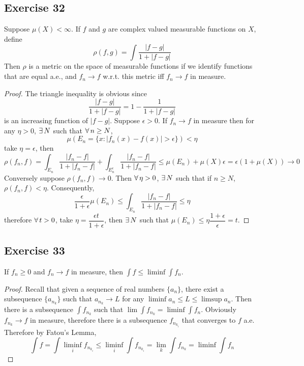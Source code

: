\subsection*{Exercise 32}
Suppose $\mu(X)<\infty$. If $f$ and $g$ are complex valued measurable functions on $X$, define
$$
\rho(f,g)=\int\dfrac{|f-g|}{1+|f-g|}
$$
Then $\rho$ is a metric on the space of measurable functions if we identify functions that are equal a.e., and $f_n\to f$ w.r.t. this metric iff $f_n\to f$ in measure.
\begin{proof}
    The triangle inequality is obvious since
    $$
    \dfrac{|f-g|}{1+|f-g|}=1-\dfrac{1}{1+|f-g|}
    $$
    is an increasing function of $|f-g|$. Suppose $\epsilon>0$. If $f_n\to f$ in measure then for any $\eta>0$, $\exists\, N$ such that $\forall\, n\ge N$,
    $$
    \mu(E_n=\{x:|f_n(x)-f(x)|>\epsilon\})<\eta
    $$
    take $\eta=\epsilon$, then
    $$
    \rho(f_n,f)=\int_{E_n}\dfrac{|f_n-f|}{1+|f_n-f|}+\int_{E_n^c}\dfrac{|f_n-f|}{1+|f_n-f|}\le\mu(E_n)+\mu(X)\epsilon=\epsilon(1+\mu(X))\to 0
    $$
    Conversely suppose $\rho(f_n,f)\to 0$. Then $\forall\,\eta>0$, $\exists\, N$ such that if $n\ge N$, $\rho(f_n,f)<\eta$. Consequently,
    $$
    \dfrac{\epsilon}{1+\epsilon}\mu(E_n)\le\int_{E_n}\dfrac{|f_n-f|}{1+|f_n-f|}\le\eta
    $$
    therefore $\forall\, t>0$, take $\eta=\dfrac{\epsilon t}{1+\epsilon}$, then $\exists\, N$ such that $\mu(E_n)\le\eta\dfrac{1+\epsilon}{\epsilon}=t$.
\end{proof}
\subsection*{Exercise 33}
If $f_n\ge 0$ and $f_n\to f$ in measure, then $\int f\le\liminf\int f_n$. 
\begin{proof}
    Recall that given a sequence of real numbers $\{a_{n}\}$, there exist a subsequence $\{a_{n_k}\}$ such that $a_{n_k}\to L$ for any $\liminf a_n\le L\le\limsup a_n$. Then there is a subsequence $\int f_{n_k}$ such that $\lim\int f_{n_k}=\liminf\int f_n$. Obviously $f_{n_k}\to f$ in measure, therefore there is a subsequence $f_{n_{k_i}}$ that converges to $f$ a.e. Therefore by Fatou's Lemma,
    $$
    \int f=\int\liminf_i f_{n_{k_i}}\le\liminf_i\int f_{n_{k_i}}=\lim_k\int f_{n_k}=\liminf\int f_n
    $$
\end{proof}
